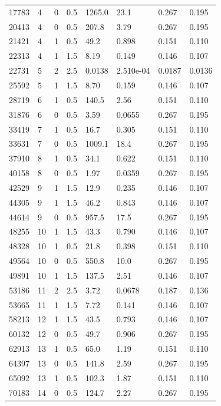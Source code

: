 \documentclass[preview]{standalone}
\begin{document}
{{\begin{tabular}{L{1.2cm}C{1.2cm} C{0.3cm}C{0.5cm} C{1.4cm}C{1.4cm} C{1.4cm}C{1.4cm}}
  17783  &     4  & 0     & 0.5 &  1265.0  & 23.1  & 0.267 &  0.195   \\ 
  20413  &     4  & 0     & 0.5 &  207.8  & 3.79  & 0.267 &  0.195   \\ 
  21421  &     4  & 1     & 0.5 &  49.2  & 0.898  & 0.151 &  0.110   \\ 
  22313  &     4  & 1     & 1.5 &  8.19  & 0.149  & 0.146 &  0.107   \\ 
  22731  &     5  & 2     & 2.5 &  0.0138  & 2.510e-04  & 0.0187 &  0.0136   \\ 
  25592  &     5  & 1     & 1.5 &  8.70  & 0.159  & 0.146 &  0.107   \\ 
  28719  &     6  & 1     & 0.5 &  140.5  & 2.56  & 0.151 &  0.110   \\ 
  31876  &     6  & 0     & 0.5 &  3.59  & 0.0655  & 0.267 &  0.195   \\ 
  33419  &     7  & 1     & 0.5 &  16.7  & 0.305  & 0.151 &  0.110   \\ 
  33631  &     7  & 0     & 0.5 &  1009.1  & 18.4  & 0.267 &  0.195   \\ 
  37910  &     8  & 1     & 0.5 &  34.1  & 0.622  & 0.151 &  0.110   \\ 
  40158  &     8  & 0     & 0.5 &  1.97  & 0.0359  & 0.267 &  0.195   \\ 
  42529  &     9  & 1     & 1.5 &  12.9  & 0.235  & 0.146 &  0.107   \\ 
  44305  &     9  & 1     & 1.5 &  46.2  & 0.843  & 0.146 &  0.107   \\ 
  44614  &     9  & 0     & 0.5 &  957.5  & 17.5  & 0.267 &  0.195   \\ 
  48255  &    10  & 1     & 1.5 &  43.3  & 0.790  & 0.146 &  0.107   \\ 
  48328  &    10  & 1     & 0.5 &  21.8  & 0.398  & 0.151 &  0.110   \\ 
  49564  &    10  & 0     & 0.5 &  550.8  & 10.0  & 0.267 &  0.195   \\ 
  49891  &    10  & 1     & 1.5 &  137.5  & 2.51  & 0.146 &  0.107   \\ 
  53186  &    11  & 2     & 2.5 &  3.72  & 0.0678  & 0.187 &  0.136   \\ 
  53665  &    11  & 1     & 1.5 &  7.72  & 0.141  & 0.146 &  0.107   \\ 
  58213  &    12  & 1     & 1.5 &  43.5  & 0.793  & 0.146 &  0.107   \\ 
  60132  &    12  & 0     & 0.5 &  49.7  & 0.906  & 0.267 &  0.195   \\ 
  62913  &    13  & 1     & 0.5 &  65.0  & 1.19  & 0.151 &  0.110   \\ 
  64397  &    13  & 0     & 0.5 &  141.8  & 2.59  & 0.267 &  0.195   \\ 
  65092  &    13  & 1     & 0.5 &  102.3  & 1.87  & 0.151 &  0.110   \\ 
  70183  &    14  & 0     & 0.5 &  124.7  & 2.27  & 0.267 &  0.195   \\ 
\hline 
\end{tabular} 

}}
\end{document}
